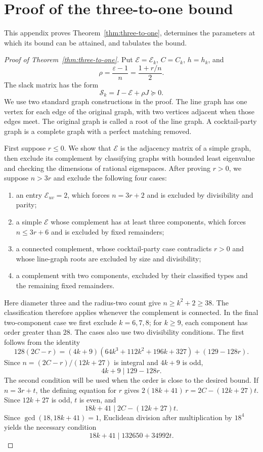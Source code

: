 \documentclass[a4paper,10pt,reqno]{amsart}
\theoremstyle{plain}
\theoremstyle{definition}
\theoremstyle{remark}
\begin{document}
\section{Proof of the three-to-one bound}
\label{app:three-to-one-proof}

This appendix proves Theorem~\ref{thm:three-to-one}, determines the
parameters at which its bound can be attained, and tabulates the bound.

\begin{proof}[Proof of Theorem~\ref{thm:three-to-one}]
Put \(\mathcal E=\mathcal E_k\), \(C=C_k\), \(h=h_k\), and
\[
 \rho=\frac{\varepsilon-1}{n}
      =\frac{1+r/n}{2}.
\]
The slack matrix has the form
\[
 \mathcal S_k=I-\mathcal E+\rho J\succeq0.
\]
We use two standard graph constructions in the proof. The line graph has
one vertex for each edge of the original graph, with two vertices adjacent
when those edges meet. The original graph is called a root of the line
graph. A cocktail-party graph is a complete graph with a perfect matching
removed.

First suppose \(r\le0\). We show that \(\mathcal E\) is the adjacency matrix
of a simple graph, then exclude its complement by classifying graphs with
bounded least eigenvalue and checking the dimensions of rational eigenspaces.
After proving \(r>0\), we suppose \(n>3r\) and exclude the following four
cases:
\begin{enumerate}
\item an entry \(\mathcal E_{uv}=2\), which forces \(n=3r+2\)
and is excluded by divisibility and parity;
\item a simple \(\mathcal E\) whose complement has at least three components,
which forces \(n\le3r+6\) and is excluded by fixed remainders;
\item a connected complement, whose cocktail-party case contradicts
\(r>0\) and whose line-graph roots are excluded by size and divisibility;
\item a complement with two components, excluded by their classified types
and the remaining fixed remainders.
\end{enumerate}
Here diameter three and the radius-two count give
\(n\ge k^2+2\ge38\).  The classification therefore applies whenever the
complement is connected.  In the final two-component case we first exclude
\(k=6,7,8\); for \(k\ge9\), each component has order greater than \(28\).
The cases also use two divisibility conditions. The first follows from
the identity
\[
 128(2C-r)
 =(4k+9)(64k^3+112k^2+196k+327)+(129-128r).
\]
Since \(n=(2C-r)/(12k+27)\) is integral and \(4k+9\) is odd,
\begin{equation}\label{eq:r-divisibility}
 4k+9\mid129-128r.
\end{equation}
The second condition will be used when the order is close to the desired
bound.  If \(n=3r+t\), the defining equation for \(r\) gives
\(2(18k+41)\,r=2C-(12k+27)t\). Since \(12k+27\) is odd, \(t\) is even, and
\[
 18k+41\mid 2C-(12k+27)t.
\]
Since \(\gcd(18,18k+41)=1\), Euclidean division after multiplication by
\(18^4\) yields the necessary condition
\begin{equation}\label{eq:fixed-remainder}
 18k+41\mid 132650+34992t.
\end{equation}


\end{proof}
\end{document}
